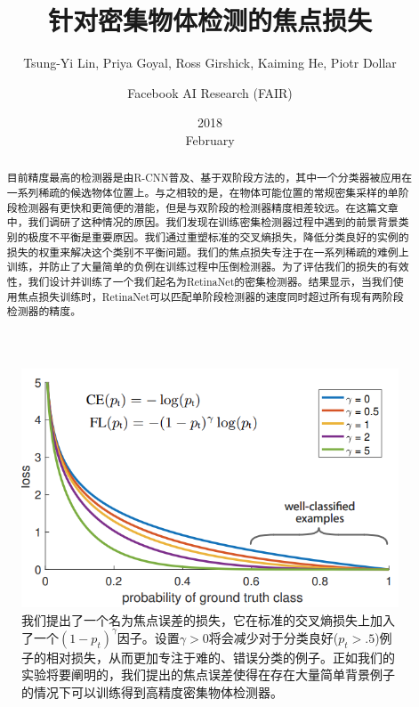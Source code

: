 \documentclass{ctexart}
\title{针对密集物体检测的焦点损失}
\date{2018 \\ February}
\author{Tsung-Yi Lin, Priya Goyal, Ross Girshick, Kaiming He, Piotr Dollar
\and Facebook AI Research (FAIR)}
\begin{document}
\maketitle
\begin{figure}[h] \label{fig:focal_loss}
    \centering
    \includegraphics[width=.8\textwidth]{images/focal_loss.png}
    \caption{我们提出了一个名为焦点误差的损失，它在标准的交叉熵损失上加入了一个$(1-p_t)^\gamma$因子。设置$\gamma > 0$将会减少对于分类良好($p_t > .5$)例子的相对损失，从而更加专注于难的、错误分类的例子。正如我们的实验将要阐明的，我们提出的焦点误差使得在存在大量简单背景例子的情况下可以训练得到高精度密集物体检测器。}
\end{figure}
\begin{abstract}
    目前精度最高的检测器是由R-CNN普及、基于双阶段方法的，其中一个分类器被应用在一系列稀疏的候选物体位置上。与之相较的是，在物体可能位置的常规密集采样的单阶段检测器有更快和更简便的潜能，但是与双阶段的检测器精度相差较远。在这篇文章中，我们调研了这种情况的原因。我们发现在训练密集检测器过程中遇到的前景背景类别的极度不平衡是重要原因。我们通过重塑标准的交叉熵损失，降低分类良好的实例的损失的权重来解决这个类别不平衡问题。我们的焦点损失专注于在一系列稀疏的难例上训练，并防止了大量简单的负例在训练过程中压倒检测器。为了评估我们的损失的有效性，我们设计并训练了一个我们起名为RetinaNet的密集检测器。结果显示，当我们使用焦点损失训练时，RetinaNet可以匹配单阶段检测器的速度同时超过所有现有两阶段检测器的精度。
\end{abstract}
\end{document}
